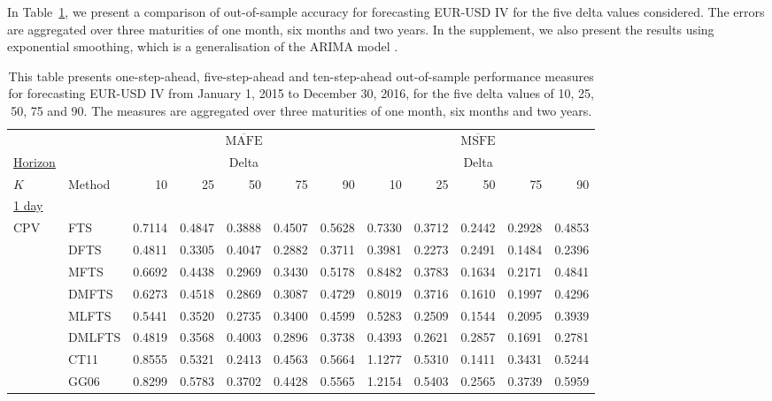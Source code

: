 \documentclass[12pt,a4paper]{article}
\begin{document}
In Table~\ref{tab:4_moneyness}, we present a comparison of out-of-sample accuracy for forecasting EUR-USD IV for the five delta values considered. The errors are aggregated over three maturities of one month, six months and two years. In the supplement, we also present the results using exponential smoothing, which is a generalisation of the ARIMA model \citep[see, e.g.,][]{KS19}.

\begin{center}
\tabcolsep 0.08in
\renewcommand{\arraystretch}{0.95}
\begin{small}
\begin{longtable}{@{}llrrrrrrrrrr@{}}
\caption{\small{This table presents one-step-ahead, five-step-ahead and ten-step-ahead out-of-sample performance measures for forecasting EUR-USD IV from January 1, 2015 to December 30, 2016, for the five delta values of 10, 25, 50, 75 and 90. The measures are aggregated over three maturities of one month, six months and two years.}}\label{tab:4_moneyness} \\
\toprule
& & \multicolumn{5}{c}{$\overline{\text{MAFE}}$} & \multicolumn{5}{c}{$\overline{\text{MSFE}}$} \\
\underline{Horizon} & & \multicolumn{5}{c}{Delta} & \multicolumn{5}{c}{Delta} \\
$K$ & Method & 10 & 25 & 50 & 75 & 90 & 10 & 25 & 50 & 75 & 90 \\ 
\endfirsthead
\midrule
\underline{1 day} \\
  CPV & FTS & 0.7114 & 0.4847 & 0.3888 & 0.4507 & 0.5628 & 0.7330 & 0.3712 & 0.2442 & 0.2928 & 0.4853 \\ 
  & DFTS & 0.4811 & 0.3305 & 0.4047 & 0.2882 & 0.3711 & 0.3981 & 0.2273 & 0.2491 & 0.1484 & 0.2396 \\ 
  & MFTS & 0.6692 & 0.4438 & 0.2969 & 0.3430 & 0.5178 & 0.8482 & 0.3783 & 0.1634 & 0.2171 & 0.4841 \\ 
  & DMFTS & 0.6273 & 0.4518 & 0.2869 & 0.3087 & 0.4729 & 0.8019 & 0.3716 & 0.1610 & 0.1997 & 0.4296 \\ 
  & MLFTS & 0.5441 & 0.3520 & 0.2735 & 0.3400 & 0.4599 & 0.5283 & 0.2509 & 0.1544 & 0.2095 & 0.3939 \\ 
  & DMLFTS & 0.4819 & 0.3568 & 0.4003 & 0.2896 & 0.3738 & 0.4393 & 0.2621 & 0.2857 & 0.1691 & 0.2781 \\ 
  & CT11 & 0.8555 & 0.5321 & 0.2413 & 0.4563 & 0.5664 & 1.1277 & 0.5310 & 0.1411 & 0.3431 & 0.5244 \\ 
  & GG06 & 0.8299 & 0.5783 & 0.3702 & 0.4428 & 0.5565 & 1.2154 & 0.5403 & 0.2565 & 0.3739 & 0.5959 \\ 

\end{longtable}
\end{small}
\end{center}
\end{document}
